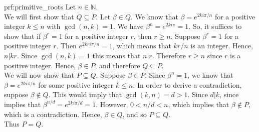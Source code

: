 \begin{prf}{prf:primitive_roots} %
Let $n \in \mathbb{N}$. \\


\noindent We will first show that $Q\subseteq P$. Let $\beta \in Q$. We know that $\beta = e^{2ki\pi/n}$ for a positive integer $k \leq n$ with $\gcd(n,k) = 1$. We have $\beta^n =e^{2ki\pi}=1$. So, it suffices to show that if $\beta^r=1$ for a positive integer $r$, then $r\geq n$. Suppose $\beta^r = 1$ for a positive integer $r$. Then $e^{2kri\pi/n} = 1$, which means that $kr/n$ is an integer. Hence, $n|kr$. Since $\gcd(n,k) = 1$ this means that $n|r$. Therefore $r\geq n$ since $r$ is a positive integer. Hence, $\beta \in P$, and therefore $Q\subseteq P$. \\

\noindent We will now show that $P\subseteq Q$. Suppose $\beta \in P$. Since $\beta^n=1$, we know that $\beta=e^{2ki\pi/n}$ for some positive integer $k\leq n$.  In order to derive a contradiction, suppose $\beta \notin Q$. This would imply that $\gcd(k,n) =d > 1$. Since $d|k$, since implies that $\beta ^{n/d} = e^{2ki\pi/d} = 1$. However, $0 < n/d < n$, which implies that $\beta \notin P$, which is a contradiction. Hence, $\beta\in Q$, and so $P \subseteq Q$.\\

\noindent Thus $P=Q$.
\end{prf} 